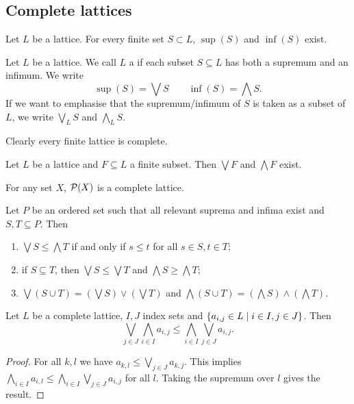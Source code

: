 \subsection{Complete lattices}
\begin{lemma}
Let $L$ be a lattice. For every finite set $S\subset L$, $\sup(S)$ and $\inf(S)$ exist.
\end{lemma}
\begin{definition}
Let $L$ be a lattice. We call $L$ a  if each subset $S\subseteq L$ has both a supremum and an infimum. We write
\[ \sup(S) = \bigvee S \qquad \inf(S) = \bigwedge S. \]
If we want to emphasise that the supremum/infimum of $S$ is taken as a subset of $L$, we write $\bigvee_L S$ and $\bigwedge_L S$.
\end{definition}
Clearly every finite lattice is complete.

\begin{lemma} \label{supInfFiniteSubsetsLattice}
Let $L$ be a lattice and $F\subseteq L$ a finite subset. Then $\bigvee F$ and $\bigwedge F$ exist. 
\end{lemma}

\begin{example}
For any set $X$, $\operatorname{\mathcal{P}}(X)$ is a complete lattice.
\end{example}

\begin{lemma}
Let $P$ be an ordered set such that all relevant suprema and infima exist and $S,T\subseteq P$. Then
\begin{enumerate}
\item $\bigvee S \leq \bigwedge T$ if and only if $s\leq t$ for all $s\in S,t\in T$;
\item if $S\subseteq T$, then $\bigvee S \leq \bigvee T$ and $\bigwedge S \geq \bigwedge T$;
\item $\bigvee(S\cup T) = \left(\bigvee S\right)\vee \left(\bigvee T\right)$ and $\bigwedge(S\cup T) = \left(\bigwedge S\right)\wedge \left(\bigwedge T\right)$.
\end{enumerate}
\end{lemma}

\begin{proposition}
Let $L$ be a complete lattice, $I,J$ index sets and $\left\{ a_{i,j}\in L \;\middle|\; i\in I, j\in J \right\}$. Then
\[ \bigvee_{j\in J}\bigwedge_{i\in I}a_{i,j} \leq \bigwedge_{i\in I}\bigvee_{j\in J} a_{i,j}. \]
\end{proposition}
\begin{proof}
For all $k,l$ we have $a_{k,l}\leq \bigvee_{j\in J} a_{k,j}$. This implies $\bigwedge_{i\in I} a_{i,l} \leq \bigwedge_{i\in I}\bigvee_{j\in J} a_{i,j}$ for all $l$. Taking the supremum over $l$ gives the result.
\end{proof}


